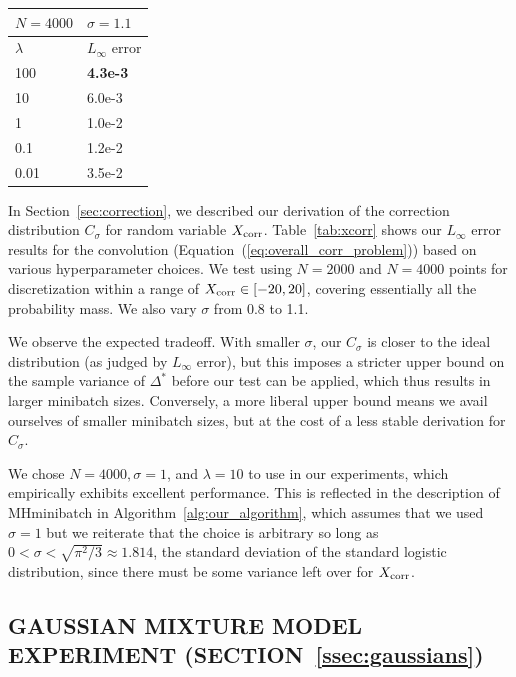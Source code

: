 \documentclass[letterpaper]{article}
\newcommand\T{\rule{0pt}{2.6ex}}       %
\newcommand\B{\rule[-1.2ex]{0pt}{0pt}} %
\begin{document}
\begin{table}[t]
\begin{center}
\begin{small}
\begin{tabular}{l l}
\hline
\T\B $N=4000$ & $\sigma=1.1$ \\
\hline
\T\B $\lambda$ & $L_{\infty}$ error \\
\hline
100    & \textbf{4.3e-3} \T \\
10     & 6.0e-3  \\
1      & 1.0e-2  \\
0.1    & 1.2e-2  \\
0.01   & 3.5e-2 \B \\
\hline
\end{tabular}
\end{small}
\end{center}
\vskip -0.1in
\end{table}

In Section~\ref{sec:correction}, we described our derivation of the correction
distribution $C_\sigma$ for random variable $X_{\rm corr}$.
Table~\ref{tab:xcorr} shows our $L_\infty$ error results for the convolution
(Equation~(\ref{eq:overall_corr_problem})) based on various hyperparameter
choices.  We test using $N=2000$ and $N=4000$ points for discretization within
a range of $X_{\rm corr} \in [-20,20]$, covering essentially all the probability
mass. We also vary $\sigma$ from 0.8 to 1.1. 

We observe the expected tradeoff. With smaller $\sigma$, our $C_\sigma$ is
closer to the ideal distribution (as judged by $L_\infty$ error), but this
imposes a stricter upper bound on the sample variance of $\Delta^*$ before our
test can be applied, which thus results in larger minibatch sizes. Conversely, a
more liberal upper bound means we avail ourselves of smaller minibatch sizes,
but at the cost of a less stable derivation for $C_\sigma$.

We chose $N=4000, \sigma=1$, and $\lambda = 10$ to use in our experiments, which
empirically exhibits excellent performance. This is reflected in the description
of {\sc MHminibatch} in Algorithm~\ref{alg:our_algorithm}, which assumes that we
used $\sigma=1$ but we reiterate that the choice is arbitrary so long as $0 <
\sigma < \sqrt{\pi^2/3} \approx 1.814$, the standard deviation of the standard
logistic distribution, since there must be some variance left over for $X_{\rm
corr}$.

\subsection{GAUSSIAN MIXTURE MODEL EXPERIMENT (SECTION~\ref{ssec:gaussians})}\label{app:gaussians}
\end{document}
